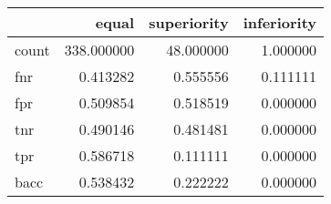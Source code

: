 \begin{tabular}{lrrr}
\toprule
{} &       equal &  superiority &  inferiority \\
\midrule
count &  338.000000 &    48.000000 &     1.000000 \\
fnr   &    0.413282 &     0.555556 &     0.111111 \\
fpr   &    0.509854 &     0.518519 &     0.000000 \\
tnr   &    0.490146 &     0.481481 &     0.000000 \\
tpr   &    0.586718 &     0.111111 &     0.000000 \\
bacc  &    0.538432 &     0.222222 &     0.000000 \\
\bottomrule
\end{tabular}
